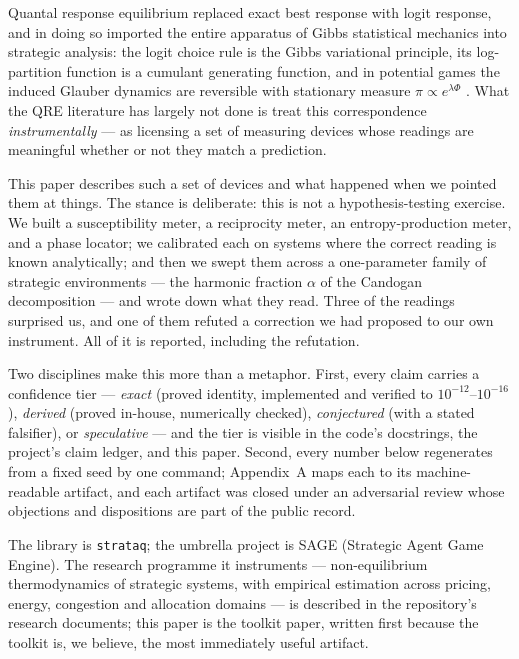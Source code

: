 Quantal response equilibrium \citep{mckelvey1995} replaced exact best response
with logit response, and in doing so imported the entire apparatus of Gibbs
statistical mechanics into strategic analysis: the logit choice rule is the
Gibbs variational principle, its log-partition function is a cumulant generating
function, and in potential games \citep{monderer1996} the induced Glauber
dynamics are reversible with stationary measure $\pi\propto e^{\lambda\Phi}$
\citep{blume1993}. What the QRE literature has largely not done is treat this
correspondence \emph{instrumentally} --- as licensing a set of measuring devices
whose readings are meaningful whether or not they match a prediction.

This paper describes such a set of devices and what happened when we pointed
them at things. The stance is deliberate: this is not a hypothesis-testing
exercise. We built a susceptibility meter, a reciprocity meter, an
entropy-production meter, and a phase locator; we calibrated each on systems
where the correct reading is known analytically; and then we swept them across
a one-parameter family of strategic environments --- the harmonic fraction
$\alpha$ of the Candogan decomposition \citep{candogan2011} --- and wrote down
what they read. Three of the readings surprised us, and one of them refuted a
correction we had proposed to our own instrument. All of it is reported,
including the refutation.

Two disciplines make this more than a metaphor. First, every claim carries a
confidence tier --- \emph{exact} (proved identity, implemented and verified to
$10^{-12}$--$10^{-16}$), \emph{derived} (proved in-house, numerically checked),
\emph{conjectured} (with a stated falsifier), or \emph{speculative} --- and the
tier is visible in the code's docstrings, the project's claim ledger, and this
paper. Second, every number below regenerates from a fixed seed by one command;
Appendix~A maps each to its machine-readable artifact, and each artifact was
closed under an adversarial review whose objections and dispositions are part
of the public record.

The library is \texttt{strataq}; the umbrella project is SAGE (Strategic Agent
Game Engine). The research programme it instruments --- non-equilibrium
thermodynamics of strategic systems, with empirical estimation across pricing,
energy, congestion and allocation domains --- is described in the repository's
research documents; this paper is the toolkit paper, written first because the
toolkit is, we believe, the most immediately useful artifact.
